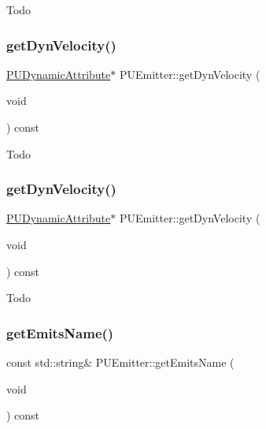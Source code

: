 Todo \mbox{\label{classPUEmitter_a0515b992a0d4ce765ccd8a58d95edf27}} 
\subsubsection{\texorpdfstring{get\+Dyn\+Velocity()}{getDynVelocity()}\hspace{0.1cm}{\footnotesize\ttfamily [1/2]}}
{\footnotesize\ttfamily \hyperlink{classPUDynamicAttribute}{P\+U\+Dynamic\+Attribute}$\ast$ P\+U\+Emitter\+::get\+Dyn\+Velocity (\begin{DoxyParamCaption}\item[{void}]{ }\end{DoxyParamCaption}) const\hspace{0.3cm}{\ttfamily [inline]}}

Todo \mbox{\label{classPUEmitter_afebcabddaaa921223bc58a5feffa0e60}} 
\subsubsection{\texorpdfstring{get\+Dyn\+Velocity()}{getDynVelocity()}\hspace{0.1cm}{\footnotesize\ttfamily [2/2]}}
{\footnotesize\ttfamily \hyperlink{classPUDynamicAttribute}{P\+U\+Dynamic\+Attribute}$\ast$ P\+U\+Emitter\+::get\+Dyn\+Velocity (\begin{DoxyParamCaption}\item[{void}]{ }\end{DoxyParamCaption}) const\hspace{0.3cm}{\ttfamily [inline]}}

Todo \mbox{\label{classPUEmitter_a619f57590dc9af6d3c2f6e72ff0f2e24}} 
\subsubsection{\texorpdfstring{get\+Emits\+Name()}{getEmitsName()}\hspace{0.1cm}{\footnotesize\ttfamily [1/2]}}
{\footnotesize\ttfamily const std\+::string\& P\+U\+Emitter\+::get\+Emits\+Name (\begin{DoxyParamCaption}\item[{void}]{ }\end{DoxyParamCaption}) const\hspace{0.3cm}{\ttfamily [inline]}}

